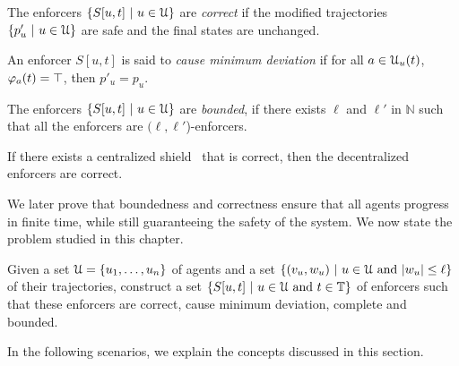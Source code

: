 \begin{defn}[Correctness]
\label{defn:correct}
The enforcers $\{S[u,t]~|~u \in \mathcal{U} \}$ are \emph{correct} if the modified trajectories $\{p'_{u}~|~ u \in \mathcal{U}\}$  are safe and the final states are unchanged.
\end{defn}

\begin{defn}
\label{defn:minimal}
An enforcer $S[u,t]$ is said to \emph{cause minimum deviation} if for all $a \in \mathcal{U}_u(t)$, $\varphi_a(t) = \top$, then $p'_u = p_u$.
\end{defn}

\begin{defn}[Boundedness]
\label{defn:bounded}
The enforcers $\{S[u,t]~|~u \in \mathcal{U}\}$ are \emph{bounded}, if there exists $\ell$ and  $\ell'$ in $\mathbb{N}$ such that all the enforcers are $(\ell,\ell'$)-enforcers. 
\end{defn}

\begin{defn}[Completeness]
\label{defn:complete}
If there exists a centralized shield~\cite{bloem2014sat} that is correct, then the decentralized enforcers are correct.
\end{defn}

 
We later prove that boundedness and correctness ensure that all agents progress in finite time, while still guaranteeing the safety of the system. We now state the problem studied in this chapter.


Given a set $\mathcal{U} = \{u_1,\dots,u_n\}$ of agents and a set $\{(v_u,w_u)~|~u \in \mathcal{U} \text{ and } |w_u| \leq \ell \}$ of their trajectories, 
construct a set $\{S[u,t]~|~u \in \mathcal{U} \text{ and } t \in \mathbb{T}\}$ of enforcers such that these enforcers are correct, cause minimum deviation, complete and bounded. 


In the following scenarios, we explain the concepts discussed in this section.

